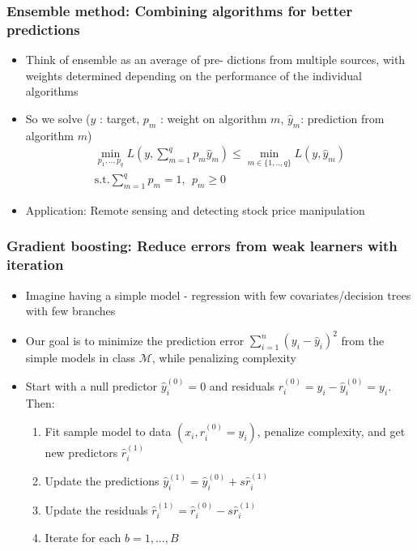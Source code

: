 \documentclass[aspectratio=169]{beamer}
\begin{document}
\begin{frame}
\frametitle{Ensemble method: Combining algorithms for better predictions}
\begin{itemize}
\item Think of ensemble as an average of pre- dictions from multiple sources, with weights determined depending on the performance of the individual algorithms
\item So we solve ($y$ : target, $p_m$ : weight on algorithm $m$, $\hat{y}_m$: prediction from algorithm $m$)
\begin{gather*}
\min_{p_1,..,p_q}L\left( y, \sum_{m=1}^q p_m\hat{y}_m\right) \leq \min_{m\in\{1,..,q\}}L(y,\hat{y}_m)\\
\text{s.t.} \sum_{m=1}^q p_m=1, \ \ p_m\geq0
\end{gather*}
\item Application: Remote sensing and detecting stock price manipulation
\end{itemize}
\end{frame}

\begin{frame}
\frametitle{Gradient boosting: Reduce errors from weak learners with iteration}
\begin{itemize}
\item Imagine having a simple model - regression with few covariates/decision trees with few branches
\item  Our goal is to minimize the prediction error $\sum_{i=1}^n (y_i-\hat{y}_i)^2 $ from the simple models in class $\mathcal{M}$, while penalizing complexity
\item Start with a null predictor $\hat{y}_i^{(0)}=0$ and residuals $r_i^{(0)}=y_i-\hat{y}_i^{(0)}=y_i$. Then:
\begin{enumerate}
\item Fit sample model to data $(x_i, r_i^{(0)} =y_i)$, penalize complexity, and get new predictors $\hat{r}_i^{(1)}$
\item Update the predictions $\hat{y}_i^{(1)}=\hat{y}_i^{(0)}+s\hat{r}_i^{(1)}$
\item Update the residuals $\hat{r}_i^{(1)}=\hat{r}_i^{(0)}-s\hat{r}_i^{(1)}$
\item Iterate for each $b=1,...,B$
\end{enumerate}
\end{itemize}
\end{frame}
\end{document}
